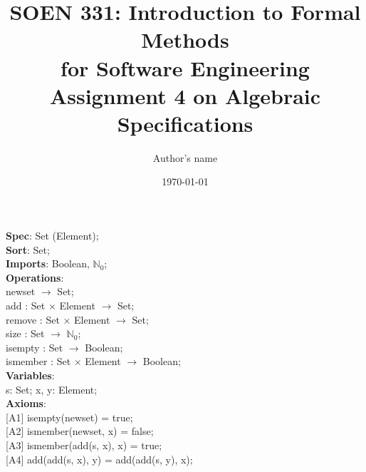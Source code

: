 \documentclass[12pt]{article}
\title{SOEN 331: Introduction to Formal Methods\\for Software Engineering\\
Assignment 4 on Algebraic Specifications}
\author{Author's name}
\date{\today}
\begin{document}
\begin{spacing}{1.5}

\maketitle

\noindent \textbf{Spec}: Set (Element);\\
\noindent \textbf{Sort}: Set;\\
\noindent \textbf{Imports}: Boolean, $\mathbb{N}_0$;\\
\noindent \textbf{Operations}:\\
\hspace*{5mm} newset $\rightarrow$ Set;\\
\hspace*{5mm} add : Set $\times$ Element $\rightarrow$ Set;\\
\hspace*{5mm} remove : Set $\times$ Element $\rightarrow$ Set;\\
\hspace*{5mm} size : Set $\rightarrow$ $\mathbb{N}_0$;\\
\hspace*{5mm} isempty : Set $\rightarrow$ Boolean;\\
\hspace*{5mm} ismember : Set $\times$ Element $\rightarrow$ Boolean;\\
\noindent \textbf{Variables}:\\
\hspace*{5mm} s: Set; x, y: Element;\\
\noindent \textbf{Axioms}:\\
\hspace*{5mm} [A1] isempty(newset) = true;\\
\hspace*{5mm} [A2] ismember(newset, x) = false;\\
\hspace*{5mm} [A3] ismember(add(s, x), x) = true;\\
\hspace*{5mm} [A4] add(add(s, x), y) = add(add(s, y), x);\\



\end{spacing}
\end{document}
